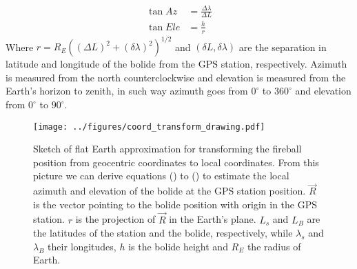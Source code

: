 \begin{align}
    \tan{Az} &= \frac{\Delta \lambda}{\Delta L} \\
    \tan{Ele} &= \frac{h}{r}
\end{align}
Where $r = R_E\left((\Delta L)^2 + (\delta\lambda)^2\right)^{1/2}$ and $(\delta L, \delta\lambda)$ are the separation in latitude and longitude of the bolide from the GPS station, respectively. Azimuth is measured from the north counterclockwise and elevation is measured from the Earth's horizon to zenith, in such way azimuth goes from $0^\circ$ to $360^\circ$ and elevation from $0^\circ$ to $90^\circ$.

\begin{figure}
    \centering
    \texttt{[image: ../figures/coord\_transform\_drawing.pdf]}
    \caption{Sketch of flat Earth approximation for transforming the fireball position from geocentric coordinates to local coordinates. From this picture we can derive equations () to () to estimate the local azimuth and elevation of the bolide at the GPS station position. $\vec{R}$ is the vector pointing to the bolide position with origin in the GPS station. $r$ is the projection of $\vec{R}$ in the Earth's plane. $L_s$ and $L_B$ are the latitudes of the station and the bolide, respectively, while $\lambda_s$ and $\lambda_B$ their longitudes, $h$ is the bolide height and $R_E$ the radius of Earth.}
    \label{fig:flat_earth_aproximation}
\end{figure}


